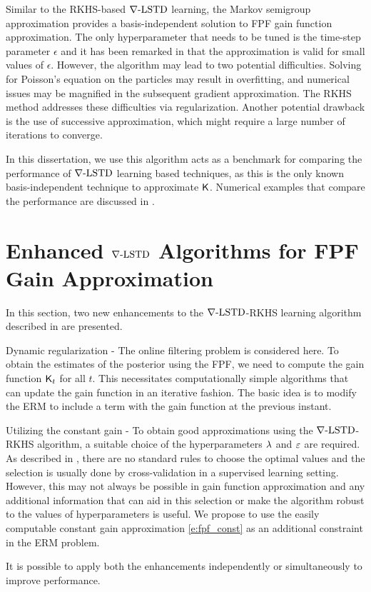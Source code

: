 Similar to the RKHS-based $\nabla\text{-LSTD}$ learning, the Markov semigroup approximation provides a basis-independent solution to FPF gain function approximation. The only hyperparameter that needs to be tuned is the time-step parameter $\epsilon$ and it has been remarked in \cite{tagmeh16} that the approximation is valid for small values of $\epsilon$. However, the algorithm may lead to two potential difficulties. Solving for Poisson's equation on the particles may result in overfitting,  and numerical issues may be magnified in the subsequent gradient approximation. The RKHS method addresses these difficulties via regularization. Another potential drawback is the use of successive approximation, which might require a large number of iterations to converge. %

In this dissertation, we use this algorithm acts as a benchmark for comparing the performance of $\nabla\text{-LSTD}$ learning based techniques, as this is the only known basis-independent technique to approximate $\text{\sf K}$. Numerical examples that compare the performance are discussed in .


\section{Enhanced $\nabla\text{-LSTD}$ Algorithms for FPF Gain Approximation} 
\label{s:fpf_rkhs_improvements}
In this section, two new enhancements to the $\nabla\text{-LSTD}$-RKHS learning algorithm described in  are presented. 
\begin{romannum}
\item Dynamic regularization - The online filtering problem is considered here. To obtain the estimates of the posterior using the FPF, we need to compute the gain function $\text{\sf K}_t$ for all $t$. This necessitates computationally simple algorithms that can update the gain function in an iterative fashion. The basic idea is to modify the ERM to include a term with the gain function at the previous instant.
\item Utilizing the constant gain - To obtain good approximations using the $\nabla\text{-LSTD}$-RKHS algorithm, a suitable choice of the hyperparameters $\lambda$ and $\varepsilon$ are required. As described in , there are no standard rules to choose the optimal values and the selection is usually done by cross-validation in a supervised learning setting. However, this may not always be possible in gain function approximation and any additional information that can aid in this selection or make the algorithm robust to the values of hyperparameters is useful. We propose to use the easily computable constant gain approximation \eqref{e:fpf_const} as an additional constraint in the ERM problem. 
\end{romannum}
It is possible to apply both the enhancements independently or simultaneously to improve performance. 

